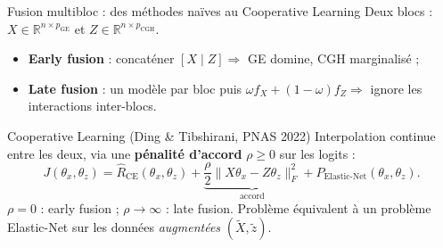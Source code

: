 \documentclass[aspectratio=169, 10pt]{beamer}
\begin{document}
\begin{frame}{Fusion multibloc : des méthodes naïves au Cooperative Learning}
  Deux blocs : $X \in \mathbb{R}^{n \times p_{\text{GE}}}$ et $Z \in \mathbb{R}^{n \times p_{\text{CGH}}}$.
  \begin{itemize}
    \item \textbf{Early fusion} : concaténer $[X \mid Z] \Rightarrow$ GE domine, CGH marginalisé ;
    \item \textbf{Late fusion} : un modèle par bloc puis $\omega f_X + (1-\omega) f_Z \Rightarrow$ ignore les interactions inter-blocs.
  \end{itemize}

  \begin{block}{Cooperative Learning (Ding \& Tibshirani, PNAS 2022)}
    Interpolation continue entre les deux, via une \textbf{pénalité d’accord} $\rho \ge 0$ sur les logits :
    \[
      J(\theta_x, \theta_z) = \hat{R}_{\text{CE}}(\theta_x, \theta_z) + \underbrace{\frac{\rho}{2} \|X \theta_x - Z \theta_z\|_F^2}_{\text{accord}} + P_{\text{Elastic-Net}}(\theta_x, \theta_z).
    \]
    $\rho = 0$ : early fusion ; $\rho \to \infty$ : late fusion. Problème équivalent à un problème Elastic-Net sur les données \textit{augmentées} $(\tilde{X}, \tilde{z})$.
  \end{block}
\end{frame}
\end{document}
